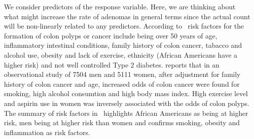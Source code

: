 \documentclass[paper=a4, fontsize=11pt]{scrartcl} %
\numberwithin{equation}{section} %
\numberwithin{figure}{section} %
\numberwithin{table}{section} %
\begin{document}
We consider predictors of the response variable. Here, we are thinking about what might increase the rate of adenomas in general terms since the actual count will be non-linearly related to any predictors.
According to~\cite{mayoclinic} risk factors for the formation of colon polyps or cancer include being over 50 years of age, inflammatory intestinal conditions, family history of colon cancer, tabacco and alcohol use, obesity and lack of exercise, ethnicity (African Americans have a higher risk) and not well controlled Type 2 diabetes. \cite{kahn} reports that in an observational study of 7504 men and 5111 women, after adjustment for family history of colon cancer and age, increased odds of colon cancer were found for smoking, high alcohol consumtion and high body mass index. High exercise level and aspirin use in women was inversely associated with the odds of colon polyps. The summary of risk factors in~\cite{grahn} highlights African Americans as being at higher risk, men being at higher risk than women and confirms smoking, obesity and inflammation as risk factors.\\
\end{document}
